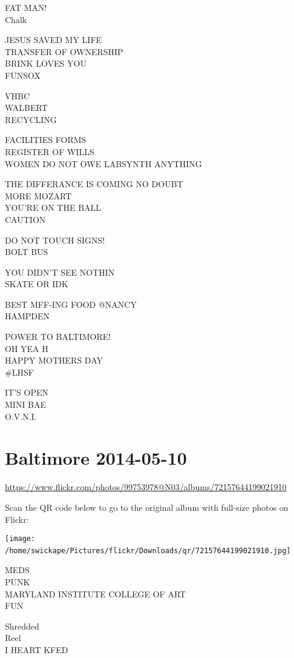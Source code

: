 \documentclass[10pt,letterpaper]{article}
\begin{document}
FAT MAN!\\
Chalk

JESUS SAVED MY LIFE\\
TRANSFER OF OWNERSHIP\\
BRINK LOVES YOU\\
FUNSOX

VHBC\\
WALBERT\\
RECYCLING

FACILITIES FORMS\\
REGISTER OF WILLS\\
WOMEN DO NOT OWE LABSYNTH ANYTHING

THE DIFFERANCE IS COMING NO DOUBT\\
MORE MOZART\\
YOU'RE ON THE BALL\\
CAUTION

DO NOT TOUCH SIGNS!\\
BOLT BUS

YOU DIDN'T SEE NOTHIN\\
SKATE OR IDK

BEST MFF{-}ING FOOD @NANCY\\
HAMPDEN

POWER TO BALTIMORE!\\
OH YEA H\\
HAPPY MOTHERS DAY\\
\#LHSF

IT'S OPEN\\
MINI BAE\\
O.V.N.I.
\

\section*{Baltimore 2014-05-10}

\url{https://www.flickr.com/photos/99753978@N03/albums/72157644199021910}

Scan the QR code below to go to the original album with full-size photos on Flickr:

\texttt{[image: /home/swickape/Pictures/flickr/Downloads/qr/72157644199021910.jpg]}
\

MEDS\\
PUNK\\
MARYLAND INSTITUTE COLLEGE OF ART\\
FUN

Shredded\\
Reel\\
I HEART KFED
\end{document}
